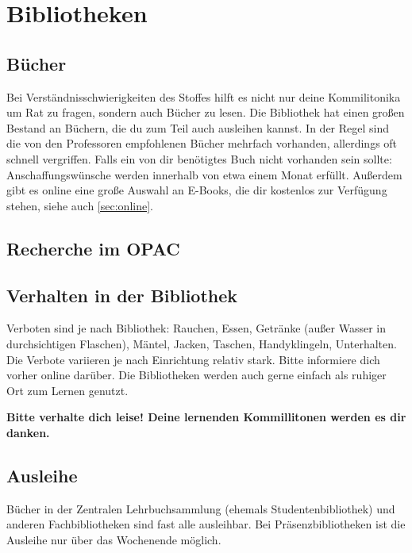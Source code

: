 \chapter{Bibliotheken}

\section{Bücher}

Bei Verständnisschwierigkeiten des Stoffes hilft es nicht nur deine Kommilitonika
um Rat zu fragen, sondern auch Bücher zu lesen. Die Bibliothek
hat einen großen Bestand an Büchern, die du zum Teil auch ausleihen kannst.
In der Regel sind die von den Professoren empfohlenen Bücher
mehrfach vorhanden, allerdings oft schnell vergriffen. Falls ein
von dir benötigtes Buch nicht vorhanden sein sollte:
Anschaffungswünsche werden innerhalb von etwa einem Monat erfüllt. Außerdem gibt es
online eine große Auswahl an E-Books, die dir kostenlos zur Verfügung stehen, siehe
auch \ref{sec:online}.

\section{Recherche im OPAC}
	\begin{urlList}
	\end{urlList}

\section{Verhalten in der Bibliothek}
Verboten sind je nach Bibliothek: Rauchen, Essen, Getränke (außer Wasser in durchsichtigen Flaschen), Mäntel, Jacken, Taschen, Handyklingeln, Unterhalten.\\
Die Verbote variieren je nach Einrichtung relativ stark. Bitte informiere dich vorher online darüber.
Die Bibliotheken werden auch gerne einfach als ruhiger Ort zum Lernen genutzt.

\textbf{Bitte verhalte dich leise!
Deine lernenden Kommillitonen werden es dir danken.}

\section{Ausleihe}

Bücher in der Zentralen Lehrbuchsammlung (ehemals
Studentenbibliothek) und anderen Fachbibliotheken sind fast alle
ausleihbar. Bei Präsenzbibliotheken ist die Ausleihe nur über das
Wochenende möglich.

